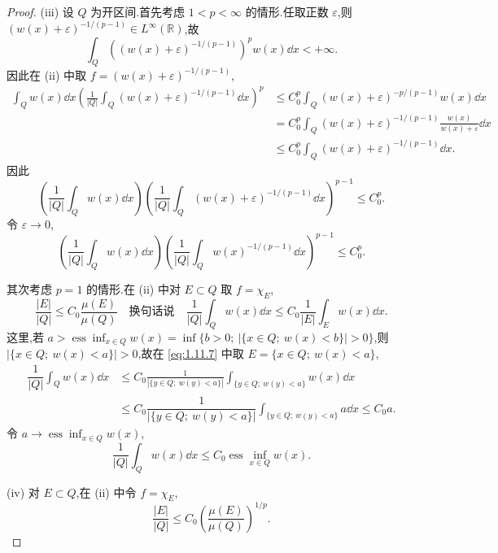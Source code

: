 \begin{proof}
(iii) 设 $Q$ 为开区间.首先考虑 $1 < p < \infty$ 的情形.任取正数 $\varepsilon$,则 $(w(x) + \varepsilon)^{-1/(p-1)} \in L^{\infty}(\mathbb{R})$,故
\begin{equation*}
\int_{Q}\left((w(x) + \varepsilon)^{-1/(p-1)}\right)^{p}w(x)\dd x < +\infty.
\end{equation*}
因此在 (ii) 中取 $f = (w(x) + \varepsilon)^{-1/(p-1)}$,
\begin{align*}
\displaystyle\int_{Q}w(x)\dd x\left(\frac{1}{|Q|}\int_{Q}(w(x) + \varepsilon)^{-1/(p-1)}\dd x\right)^{p}&\leq C_{0}^{p}\displaystyle\int_{Q}(w(x) + \varepsilon)^{-p/(p-1)}w(x)\dd x  \\
&= C_{0}^{p}\displaystyle\int_{Q}(w(x) + \varepsilon)^{-1/(p-1)}\frac{w(x)}{w(x) + \varepsilon}\dd x \\
&\leq C_{0}^{p}\displaystyle\int_{Q}(w(x) + \varepsilon)^{-1/(p-1)}\dd x.
\end{align*}
因此
\begin{equation*}
\left(\frac{1}{|Q|}\int_{Q}w(x)\dd x\right)\left(\frac{1}{|Q|}\int_{Q}(w(x) + \varepsilon)^{-1/(p-1)}\dd x\right)^{p-1} \leq C_{0}^{p}.
\end{equation*}
令 $\varepsilon \to 0$,
\begin{equation*}
\left(\frac{1}{|Q|}\int_{Q}w(x)\dd x\right)\left(\frac{1}{|Q|}\int_{Q}w(x)^{-1/(p-1)}\dd x\right)^{p-1} \leq C_{0}^{p}.
\end{equation*}

其次考虑 $p = 1$ 的情形.在 (ii) 中对 $E \subset Q$ 取 $f = \chi_{E}$,
\begin{equation}\tag{1.11.7}
\frac{|E|}{|Q|} \leq C_{0}\frac{\mu(E)}{\mu(Q)} \quad \text{换句话说} \quad \frac{1}{|Q|}\int_{Q}w(x)\dd x \leq C_{0}\frac{1}{|E|}\int_{E}w(x)\dd x.
\label{eq:1.11.7}\end{equation}
这里,若 $a > \operatorname{ess}\inf_{x \in Q}w(x) = \inf\{b > 0;\ |\{x \in Q;\ w(x) < b\}| > 0\}$,则 $|\{x \in Q;\ w(x) < a\}| > 0$,故在 \eqref{eq:1.11.7} 中取 $E = \{x \in Q;\ w(x) < a\}$,
\begin{align*}
\dfrac{1}{|Q|}\displaystyle\int_{Q}w(x)\dd x &\leq C_{0}\frac{1}{|\{y \in Q;\ w(y) < a\}|}\int_{\{y \in Q;\ w(y) < a\}}w(x)\dd x \\
\qquad \qquad \qquad &\leq C_{0}\dfrac{1}{|\{y \in Q;\ w(y) < a\}|}\int_{\{y \in Q;\ w(y) < a\}}a\dd x \leq C_{0}a.
\end{align*}
令 $a \to \operatorname{ess}\inf_{x \in Q}w(x)$,
\begin{equation*}
\frac{1}{|Q|}\int_{Q}w(x)\dd x \leq C_{0}\operatorname{ess}\inf_{x \in Q}w(x).
\end{equation*}

(iv) 对 $E \subset Q$,在 (ii) 中令 $f = \chi_{E}$,
\begin{equation*}
\frac{|E|}{|Q|} \leq C_{0}\left(\frac{\mu(E)}{\mu(Q)}\right)^{1/p}.
\end{equation*}
\end{proof}

